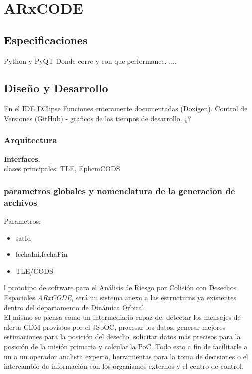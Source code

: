 \chapter{ARxCODE}
\label{chap:arxcode} 

\section{Especificaciones}
Python y PyQT
Donde corre y con que performance.
....


\section{Diseño y Desarrollo}
En el IDE EClipse
Funciones enteramente documentadas (Doxigen).
Control de Versiones (GitHub) - graficos de los tiempos de desarrollo. ¿?


\subsection{Arquitectura}
{\bf{Interfaces.}}\\
clases principales: TLE, EphemCODS
\subsection{parametros globales y nomenclatura de la generacion de archivos}
Parametros:\\
\begin{itemize}
 \item satId
 \item fechaIni,fechaFin
 \item TLE/CODS
\end{itemize}

l prototipo de software para el An\'alisis de Riesgo por Colisi\'on con Desechos Espaciales {\it{ARxCODE}}, ser\'a un sistema anexo a las estructuras ya existentes dentro del departamento de Din\'amica Orbital.\\
El mismo se piensa como un intermediario capaz de: detectar los mensajes de alerta CDM provistos por el JSpOC, procesar los datos, generar mejores estimaciones para la posici\'on del desecho, solicitar datos m\'as precisos para la posici\'on de la misi\'on primaria y calcular la PoC. Todo esto a fin de facilitarle a un a un operador analista experto, herramientas para la toma de decisiones o el intercambio de informaci\'on con los organismos externos y el centro de control.\\

